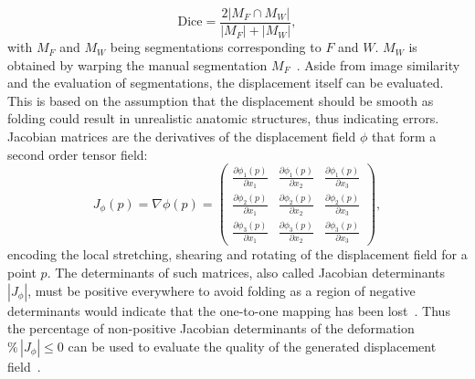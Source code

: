 \begin{equation}
	\text{Dice} = \frac{2 |M_F \cap M_W|}{|M_F| + |M_W|},
\end{equation}
with $M_F$ and $M_W$ being segmentations corresponding to $F$ and $W$. $M_W$ is obtained by warping the manual segmentation $M_F$~\cite{NiftiReg}. Aside from image similarity and the evaluation of segmentations, the displacement itself can be evaluated. This is based on the assumption that the displacement should be smooth as folding could result in unrealistic anatomic structures, thus indicating errors. Jacobian matrices are the derivatives of the displacement field $\phi$ that form a second order tensor field:
\begin{equation}
	J_{\phi}(p) = \nabla \mathbb{\phi} (p) = \begin{pmatrix}
	\frac{\partial \phi_1(p)}{\partial x_1} & \frac{\partial \phi_1(p)}{\partial x_2} & \frac{\partial \phi_1(p)}{\partial x_3} \\
	\frac{\partial \phi_2(p)}{\partial x_1} & \frac{\partial \phi_2(p)}{\partial x_2} & \frac{\partial \phi_2(p)}{\partial x_3} \\
	\frac{\partial \phi_3(p)}{\partial x_1} & \frac{\partial \phi_3(p)}{\partial x_2} & \frac{\partial \phi_3(p)}{\partial x_3} 
	\end{pmatrix},
\end{equation}
encoding the local stretching, shearing and rotating of the displacement field for a point $p$. The determinants of such matrices, also called Jacobian determinants $|J_{\phi}|$, must be positive everywhere to avoid folding as a region of negative determinants would indicate that the one-to-one mapping has been lost~\cite{DARTEL}. Thus the percentage of non-positive Jacobian determinants of the deformation $\% \, |J_{\phi}|\leq0$ can be used to evaluate the quality of the generated displacement field~\cite{Chen2023}.
